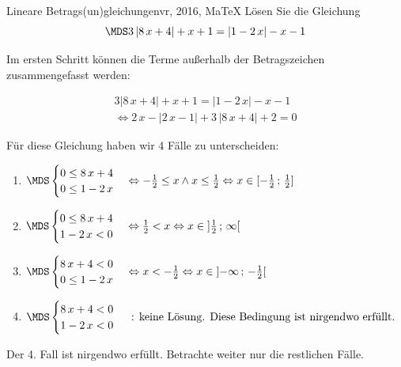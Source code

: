 \providecommand{\MoIl}[1][]{\mbox{}#1]\mathopen{}} 
 \providecommand{\MoIr}[1][]{#1[\mbox{}} 
 \providecommand{\MIntvlSep}{;} 
 \providecommand{\MElSetSep}{\, ; \, } 
 \begin{MAufgabe}{Lineare Betrags(un)gleichungen}{vr, 2016, MaTeX}
L\"osen Sie die Gleichung
$$
 \MDS 3\left| 8\, x + 4 \right|+x + 1=  \left| 1 - 2\, x \right|  - x - 1
$$  

\ifLsg\MLoesung

Im ersten Schritt k\"onnen die Terme au\ss{}erhalb der Betragszeichen zusammengefasst werden:

\begin{align*} 
 3\left| 8\, x + 4 \right|+x + 1=  \left| 1 - 2\, x \right|  - x - 1\\ 
\Leftrightarrow2\, x - \left|2\, x - 1\right| + 3\, \left|8\, x + 4\right| + 2= 0 
 \end{align*}

F\"ur diese Gleichung haben wir 4 F\"alle zu unterscheiden: 
\begin{enumerate}
\item $ \MDS 
\begin{cases} 
 0 \leq 8\, x + 4\\ 
0 \leq 1 - 2\, x
 \end{cases}
\Leftrightarrow - \frac{1}{2} \leq x \wedge x \leq \frac{1}{2}\Leftrightarrow x \in [ - \frac{1}{2} \, \MIntvlSep \, \frac{1}{2}]$ 
\item $ \MDS 
\begin{cases} 
 0 \leq 8\, x + 4\\ 
1 - 2\, x < 0
 \end{cases}
\Leftrightarrow \frac{1}{2} < x\Leftrightarrow x \in \MoIl  \frac{1}{2} \, \MIntvlSep \, \infty\MoIr $ 
\item $ \MDS 
\begin{cases} 
 8\, x + 4 < 0\\ 
0 \leq 1 - 2\, x
 \end{cases}
\Leftrightarrow x < - \frac{1}{2}\Leftrightarrow x \in \MoIl  -\infty \, \MIntvlSep \, - \frac{1}{2}\MoIr $ 
\item $ \MDS 
\begin{cases} 
 8\, x + 4 < 0\\ 
1 - 2\, x < 0
 \end{cases}
 \mbox{ : keine L\"osung. Diese Bedingung ist nirgendwo erf\"ullt.}$ 
\end{enumerate} 
Der 4. Fall ist nirgendwo erf\"ullt. Betrachte weiter nur die restlichen F\"alle.
 

\end{MAufgabe}

